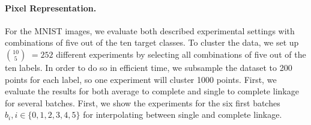 \paragraph{Pixel Representation.} For the MNIST images, we evaluate both described experimental settings with combinations of five out of the ten target classes. To cluster the data, we set up $10 \choose 5$ $= 252$ different experiments by selecting all combinations of five out of the ten labels. In order to do so in efficient time, we subsample the dataset to 200 points for each label, so one experiment will cluster 1000 points. First, we evaluate the results for both average to complete and single to complete linkage for several batches. First, we show the experiments for the six first batches $b_i, i \in \{0, 1, 2, 3, 4, 5\}$ for interpolating between single and complete linkage.

